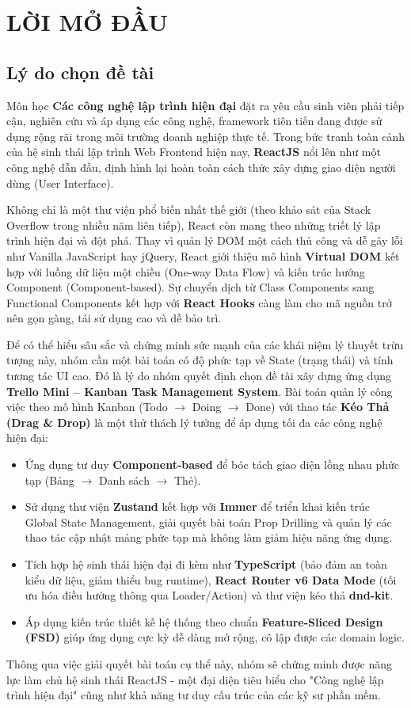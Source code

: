 \chapter*{LỜI MỞ ĐẦU}

\section{Lý do chọn đề tài}
Môn học \textbf{Các công nghệ lập trình hiện đại} đặt ra yêu cầu sinh viên phải tiếp cận, nghiên cứu và áp dụng các công nghệ, framework tiên tiến đang được sử dụng rộng rãi trong môi trường doanh nghiệp thực tế. Trong bức tranh toàn cảnh của hệ sinh thái lập trình Web Frontend hiện nay, \textbf{ReactJS} nổi lên như một công nghệ dẫn đầu, định hình lại hoàn toàn cách thức xây dựng giao diện người dùng (User Interface).

Không chỉ là một thư viện phổ biến nhất thế giới (theo khảo sát của Stack Overflow trong nhiều năm liên tiếp), React còn mang theo những triết lý lập trình hiện đại và đột phá. Thay vì quản lý DOM một cách thủ công và dễ gây lỗi như Vanilla JavaScript hay jQuery, React giới thiệu mô hình \textbf{Virtual DOM} kết hợp với luồng dữ liệu một chiều (One-way Data Flow) và kiến trúc hướng Component (Component-based). Sự chuyển dịch từ Class Components sang Functional Components kết hợp với \textbf{React Hooks} càng làm cho mã nguồn trở nên gọn gàng, tái sử dụng cao và dễ bảo trì.

Để có thể hiểu sâu sắc và chứng minh sức mạnh của các khái niệm lý thuyết trừu tượng này, nhóm cần một bài toán có độ phức tạp về State (trạng thái) và tính tương tác UI cao. Đó là lý do nhóm quyết định chọn đề tài xây dựng ứng dụng \textbf{Trello Mini – Kanban Task Management System}. Bài toán quản lý công việc theo mô hình Kanban (Todo $\rightarrow$ Doing $\rightarrow$ Done) với thao tác \textbf{Kéo Thả (Drag \& Drop)} là một thử thách lý tưởng để áp dụng tối đa các công nghệ hiện đại:
\begin{itemize}
    \item Ứng dụng tư duy \textbf{Component-based} để bóc tách giao diện lồng nhau phức tạp (Bảng $\rightarrow$ Danh sách $\rightarrow$ Thẻ).
    \item Sử dụng thư viện \textbf{Zustand} kết hợp với \textbf{Immer} để triển khai kiến trúc Global State Management, giải quyết bài toán Prop Drilling và quản lý các thao tác cập nhật mảng phức tạp mà không làm giảm hiệu năng ứng dụng.
    \item Tích hợp hệ sinh thái hiện đại đi kèm như \textbf{TypeScript} (bảo đảm an toàn kiểu dữ liệu, giảm thiểu bug runtime), \textbf{React Router v6 Data Mode} (tối ưu hóa điều hướng thông qua Loader/Action) và thư viện kéo thả \textbf{dnd-kit}.
    \item Áp dụng kiến trúc thiết kế hệ thống theo chuẩn \textbf{Feature-Sliced Design (FSD)} giúp ứng dụng cực kỳ dễ dàng mở rộng, cô lập được các domain logic.
\end{itemize}
Thông qua việc giải quyết bài toán cụ thể này, nhóm sẽ chứng minh được năng lực làm chủ hệ sinh thái ReactJS - một đại diện tiêu biểu cho "Công nghệ lập trình hiện đại" cũng như khả năng tư duy cấu trúc của các kỹ sư phần mềm.

